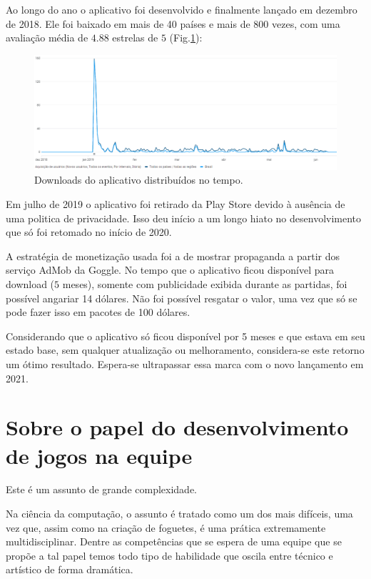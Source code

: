    Ao longo do ano o aplicativo foi desenvolvido e finalmente lançado em dezembro de 2018. Ele foi baixado em mais de 40 países e mais de 800 vezes, com uma avaliação média de $4.88$ estrelas de $5$ (Fig.\ref{grafico_inicial}): 

    \begin{figure}[h!]
        \centering
        \includegraphics[trim = {0cm 0cm 0cm 0cm}, clip , angle=0, scale=0.55]{midia/users_global.png}
        \caption{Downloads do aplicativo distribuídos no tempo.}
        \label{grafico_inicial}
    \end{figure}

    Em julho de 2019 o aplicativo foi retirado da Play Store devido à ausência de uma politica de privacidade. Isso deu início a um longo hiato no desenvolvimento que só foi retomado no início de 2020. 
    
    A estratégia de monetização usada foi a de mostrar propaganda a partir dos serviço AdMob da Goggle.
    No tempo que o aplicativo ficou disponível para download ($5$ meses), somente com publicidade exibida durante as partidas, foi possível angariar 14 dólares. Não foi possível resgatar o valor, uma vez que só se pode fazer isso em pacotes de 100 dólares.

    Considerando que o aplicativo só ficou disponível por 5 meses e que estava em seu estado base, sem qualquer atualização ou melhoramento, considera-se este retorno um ótimo resultado. Espera-se ultrapassar essa marca com o novo lançamento em 2021.

    \section{Sobre o papel do desenvolvimento de jogos na equipe}

        Este é um assunto de grande complexidade. 
        
        Na ciência da computação, o assunto é tratado como um dos mais difíceis, uma vez que, assim como na criação de foguetes, é uma prática extremamente multidisciplinar. 
        Dentre as competências que se espera de uma equipe que se propõe a tal papel temos todo tipo de habilidade que oscila entre técnico e artístico de forma dramática. 

